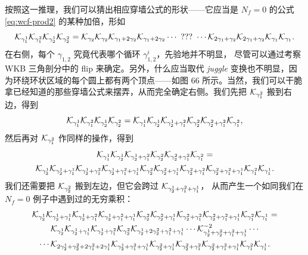 按照这一推理，我们可以猜出相应穿墙公式的形状——它应当是 $N_f = 0$ 的公式
\eqref{eq:wcf-prod2} 的某种加倍，形如
\begin{equation}
\mathcal{K}_{\gamma^1_1} \mathcal{K}_{\gamma^2_1} \mathcal{K}_{\gamma^1_2} \mathcal{K}_{\gamma^2_2}
= \mathcal{K}_{\gamma_2}\mathcal{K}_{\gamma_2} \mathcal{K}_{\gamma_1+2 \gamma_2}\mathcal{K}_{\gamma_1+2 \gamma_2} \cdots\ \text{???}\ \cdots \mathcal{K}_{2\gamma_1+\gamma_2}\mathcal{K}_{2\gamma_1+\gamma_2}\mathcal{K}_{\gamma_1}\mathcal{K}_{\gamma_1}.
\end{equation}
在右侧，每个 $\gamma_{1,2}$ 究竟代表哪个循环 $\gamma_{1,2}^i$，先验地并不明显，
尽管可以通过考察 WKB 三角剖分中的 flip 来确定。另外，什么应当取代 \emph{juggle}
变换也不明显，因为环绕环状区域的每个圆上都有两个顶点——如图 66%
所示。当然，我们可以干脆拿已经知道的那些穿墙公式来摆弄，从而完全确定右侧。我们先把
$\mathcal{K}_{\gamma_1^2}$ 搬到右边，得到
\begin{equation}
\mathcal{K}_{\gamma_1^1}\mathcal{K}_{\gamma_1^2} \mathcal{K}_{\gamma_2^1}\mathcal{K}_{\gamma_2^2} =
\mathcal{K}_{\gamma_1^1} \mathcal{K}_{\gamma_2^1}\mathcal{K}_{\gamma_2^1+\gamma_1^2}\mathcal{K}_{\gamma_2^2}\mathcal{K}_{\gamma_2^2+\gamma_1^2} \mathcal{K}_{\gamma_1^2},
\end{equation}
然后再对 $\mathcal{K}_{\gamma_1^2}$ 作同样的操作，得到
\begin{multline}
\mathcal{K}_{\gamma_1^1} \mathcal{K}_{\gamma_2^1}\mathcal{K}_{\gamma_2^1+\gamma_1^2}\mathcal{K}_{\gamma_2^2}\mathcal{K}_{\gamma_2^2+\gamma_1^2} \mathcal{K}_{\gamma_1^2}
= \\ \mathcal{K}_{\gamma_2^1} \mathcal{K}_{\gamma_2^1+\gamma_1^1} \mathcal{K}_{\gamma_2^1+\gamma_1^2} \mathcal{K}_{\gamma_2^1+\gamma_1^2+\gamma_1^1} \mathcal{K}_{\gamma_2^2} \mathcal{K}_{\gamma_2^2+\gamma_1^1}
\mathcal{K}_{\gamma_2^2+\gamma_1^2}\mathcal{K}_{\gamma_2^2+\gamma_1^2+\gamma_1^1}  \mathcal{K}_{\gamma_1^2}  \mathcal{K}_{\gamma_1^1}.
\end{multline}
我们还需要把 $\mathcal{K}_{\gamma_2^2}$ 搬到左边，但它会跨过 $\mathcal{K}_{\gamma_2^1+\gamma_1^2+\gamma_1^1}$，
从而产生一个如同我们在 $N_f = 0$ 例子中遇到过的无穷乘积：
\begin{multline}
\mathcal{K}_{\gamma_2^1} \mathcal{K}_{\gamma_2^1+\gamma_1^1} \mathcal{K}_{\gamma_2^1+\gamma_1^2} \mathcal{K}_{\gamma_2^1+\gamma_1^2+\gamma_1^1} \mathcal{K}_{\gamma_2^2} \mathcal{K}_{\gamma_2^2+\gamma_1^1}
\mathcal{K}_{\gamma_2^2+\gamma_1^2}\mathcal{K}_{\gamma_2^2+\gamma_1^2+\gamma_1^1}  \mathcal{K}_{\gamma_1^2}  \mathcal{K}_{\gamma_1^1}
= \\ \mathcal{K}_{\gamma_2^1} \mathcal{K}_{\gamma_2^1+\gamma_1^1} \mathcal{K}_{\gamma_2^1+\gamma_1^2} \mathcal{K}_{\gamma_2^2}\mathcal{K}_{\gamma_2^1+2\gamma_2^2+\gamma_1^2+\gamma_1^1}\cdots
\mathcal{K}_{\gamma_2^1+\gamma_2^2+\gamma_1^2+\gamma_1^1}^{-2}\cdots \\ \cdots
 \mathcal{K}_{2\gamma_2^1+\gamma_2^2+2\gamma_1^2+2\gamma_1^1}\mathcal{K}_{\gamma_2^1+\gamma_1^2+\gamma_1^1} \mathcal{K}_{\gamma_2^2+\gamma_1^1}
\mathcal{K}_{\gamma_2^2+\gamma_1^2}\mathcal{K}_{\gamma_2^2+\gamma_1^2+\gamma_1^1}  \mathcal{K}_{\gamma_1^2}  \mathcal{K}_{\gamma_1^1}.
\end{multline}
